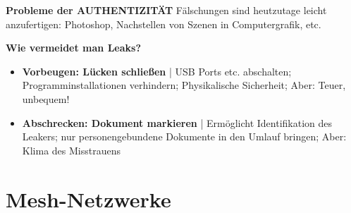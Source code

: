 \documentclass{article} %
\begin{document}
\textbf{Probleme der AUTHENTIZITÄT}
Fälschungen sind heutzutage leicht anzufertigen: Photoshop, Nachstellen von Szenen in Computergrafik, etc.

\textbf{Wie vermeidet man Leaks?}
\begin{itemize}
	\item \textbf{Vorbeugen: Lücken schließen} | USB Ports etc. abschalten; Programminstallationen verhindern; Physikalische Sicherheit; Aber: Teuer, unbequem!
	\item \textbf{Abschrecken: Dokument markieren} | Ermöglicht Identifikation des Leakers; nur personengebundene Dokumente in den Umlauf bringen; Aber: Klima des Misstrauens
\end{itemize}

\section{Mesh-Netzwerke}
\end{document}
